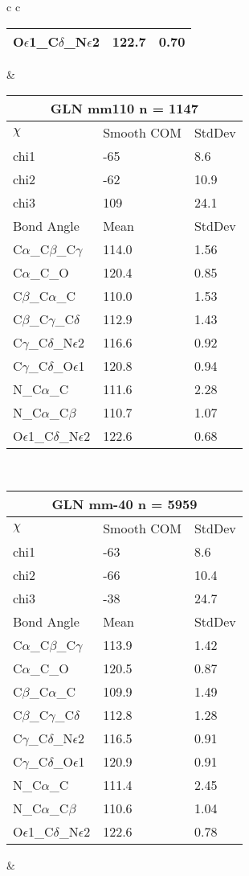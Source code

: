 \begin{longtable}{ c c }
\begin{tabular}{ l l l }
  O$\epsilon$1\_C$\delta$\_N$\epsilon$2 & 122.7 & 0.70\\
  \bottomrule
  \end{tabular}
  &
  \begin{tabular}{ l l l }
  \toprule
  \multicolumn{3}{c}{GLN \textbf{mm110} n = 1147} \\ \toprule
  $\chi$       & Smooth COM & StdDev \\ \midrule
  chi1 & -65 & 8.6 \\ 
  chi2 & -62 & 10.9 \\ 
  chi3 & 109 & 24.1 \\ \midrule
  Bond Angle   & Mean     & StdDev \\ \midrule
  C$\alpha$\_C$\beta$\_C$\gamma$ & 114.0 & 1.56\\
  C$\alpha$\_C\_O & 120.4 & 0.85\\
  C$\beta$\_C$\alpha$\_C & 110.0 & 1.53\\
  C$\beta$\_C$\gamma$\_C$\delta$ & 112.9 & 1.43\\
  C$\gamma$\_C$\delta$\_N$\epsilon$2 & 116.6 & 0.92\\
  C$\gamma$\_C$\delta$\_O$\epsilon$1 & 120.8 & 0.94\\
  N\_C$\alpha$\_C & 111.6 & 2.28\\
  N\_C$\alpha$\_C$\beta$ & 110.7 & 1.07\\
  O$\epsilon$1\_C$\delta$\_N$\epsilon$2 & 122.6 & 0.68\\
  \bottomrule
  \end{tabular}
  \\
  \begin{tabular}{ l l l }
  \toprule
  \multicolumn{3}{c}{GLN \textbf{mm-40} n = 5959} \\ \toprule
  $\chi$       & Smooth COM & StdDev \\ \midrule
  chi1 & -63 & 8.6 \\ 
  chi2 & -66 & 10.4 \\ 
  chi3 & -38 & 24.7 \\ \midrule
  Bond Angle   & Mean     & StdDev \\ \midrule
  C$\alpha$\_C$\beta$\_C$\gamma$ & 113.9 & 1.42\\
  C$\alpha$\_C\_O & 120.5 & 0.87\\
  C$\beta$\_C$\alpha$\_C & 109.9 & 1.49\\
  C$\beta$\_C$\gamma$\_C$\delta$ & 112.8 & 1.28\\
  C$\gamma$\_C$\delta$\_N$\epsilon$2 & 116.5 & 0.91\\
  C$\gamma$\_C$\delta$\_O$\epsilon$1 & 120.9 & 0.91\\
  N\_C$\alpha$\_C & 111.4 & 2.45\\
  N\_C$\alpha$\_C$\beta$ & 110.6 & 1.04\\
  O$\epsilon$1\_C$\delta$\_N$\epsilon$2 & 122.6 & 0.78\\
  \bottomrule
  \end{tabular}
  &
  \\
  
\end{longtable}

